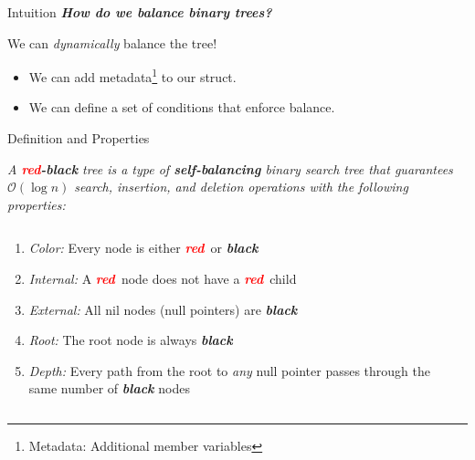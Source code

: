 \documentclass[aspectratio=169]{beamer}
\newcommand{\textib}[1]{\textit{\textbf{{#1}}}}
\newcommand{\red}{\textib{\textcolor{red}{red}}}
\newenvironment{define}{\begin{tcolorbox}[title={Definition}]\begin{small}}{\end{small}\end{tcolorbox}}
\begin{document}
\begin{frame}{Intuition}
    \textib{How do we balance binary trees?} \vspace{1em}

    \noindent We can \textit{dynamically} balance the tree!
    \begin{itemize}[label=$\to$]
        \item We can add metadata\footnote{Metadata: Additional member variables} to our
             struct.
        \item We can define a set of conditions that enforce balance.
    \end{itemize}
\end{frame}


\begin{frame}[label=def,fragile]{Definition and Properties}
    \begin{define}
        \it
        {
            A \red\textib{-black} tree is a type of \textib{self-balancing} binary
            search tree that guarantees $\mathcal{O}(\log n)$ search, insertion, and deletion operations
            with the following properties:
        }
    \end{define}
    \begin{columns}
        \begin{column}{.5\textwidth}
            \begin{adjustbox}{valign=T, minipage=[t]{\textwidth}}
                \begin{enumerate}[label=\textit{(\roman*)}]
                    \item<1> \textit{Color:} Every node is either \red \ or \textib{black}
                    \item<2> \textit{Internal:} A \red \ node does not have a \red \ child
                    \item<3> \textit{External:} All nil nodes (null pointers) are \textib{black}
                    \item<4> \textit{Root:} The root node is always \textib{black}
                    \item<5> \textit{Depth:} Every path from the root to \textit{any} null pointer
                        passes through the same number of \textib{black} nodes
                \end{enumerate}
            \end{adjustbox}
        \end{column}

        \begin{column}{.5\textwidth}
        \end{column}
    \end{columns}
\end{frame}
\end{document}
